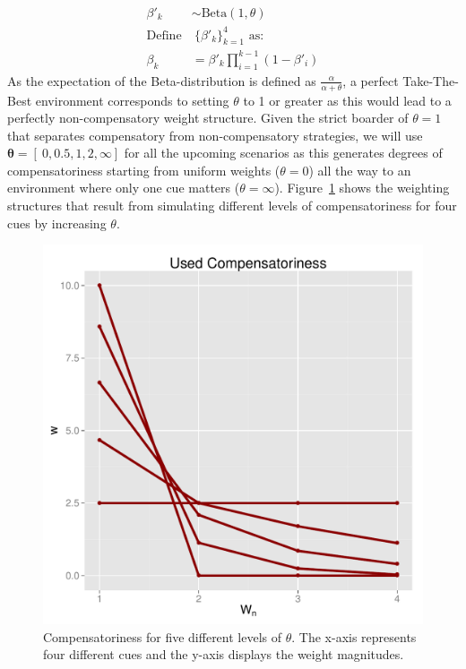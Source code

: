 \documentclass[10pt,letterpaper]{article}
\begin{document}
\begin{align}
\beta'_k &\sim \text{Beta}(1,\theta)\\
\text{Define}&~ \{\beta'_k\}^4_{k=1}\text{ as:}\\
\beta_k&=\beta'_k\prod_{i=1}^{k-1}(1-\beta'_i) 
\end{align}
As the expectation of the Beta-distribution is defined as $\frac{\alpha}{\alpha+\theta}$, a perfect  Take-The-Best environment corresponds to setting $\theta$ to 1 or greater as this would lead to a perfectly non-compensatory weight structure. Given the strict boarder of $\theta=1$ that separates compensatory from non-compensatory strategies, we will use $\mathbf{\theta}=[~0,0.5,1,2,\infty]$ for all the upcoming scenarios as this generates degrees of compensatoriness starting from uniform weights ($\theta=0$) all the way to an environment where only one cue matters ($\theta=\infty$). Figure~\ref{comp} shows the weighting structures that result from simulating different levels of compensatoriness for four cues by increasing $\theta$.  
\begin{figure}[htb!]
  \centering
    \caption{Compensatoriness for five different levels of $\theta$. The x-axis represents four different cues and the y-axis displays the weight magnitudes.}
\label{comp}
    \includegraphics[scale=0.4]{comp.pdf}

\end{figure}
\noindent
\end{document}
